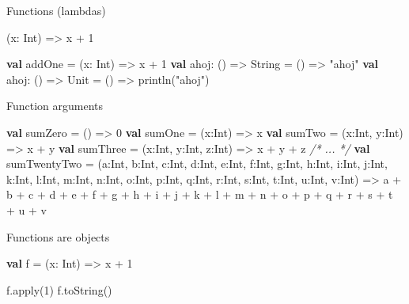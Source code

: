 \documentclass[ignorenonframetext,]{beamer}
\newenvironment{Shaded}{\begin{snugshade}}{\end{snugshade}}
\newcommand{\KeywordTok}[1]{\textcolor[rgb]{0.13,0.29,0.53}{\textbf{#1}}}
\newcommand{\DecValTok}[1]{\textcolor[rgb]{0.00,0.00,0.81}{#1}}
\newcommand{\StringTok}[1]{\textcolor[rgb]{0.31,0.60,0.02}{#1}}
\newcommand{\CommentTok}[1]{\textcolor[rgb]{0.56,0.35,0.01}{\textit{#1}}}
\newcommand{\FunctionTok}[1]{\textcolor[rgb]{0.00,0.00,0.00}{#1}}
\newcommand{\NormalTok}[1]{#1}
\begin{document}
\begin{frame}[fragile]
\begin{block}{Functions (lambdas)}
\begin{Shaded}
\begin{Highlighting}[]
\NormalTok{(x: Int) => x + }\DecValTok{1}
\end{Highlighting}
\end{Shaded}

\begin{Shaded}
\begin{Highlighting}[]
\KeywordTok{val}\NormalTok{ addOne = (x: Int) => x + }\DecValTok{1}
\KeywordTok{val}\NormalTok{ ahoj: () => String = () => }\StringTok{"ahoj"}
\KeywordTok{val}\NormalTok{ ahoj: () => Unit = () => }\FunctionTok{println}\NormalTok{(}\StringTok{"ahoj"}\NormalTok{)}
\end{Highlighting}
\end{Shaded}

\end{block}

\begin{block}{Function arguments}

\begin{Shaded}
\begin{Highlighting}[]
\KeywordTok{val}\NormalTok{ sumZero = () => }\DecValTok{0}
\KeywordTok{val}\NormalTok{ sumOne = (x:Int) => x}
\KeywordTok{val}\NormalTok{ sumTwo = (x:Int, y:Int) => x + y}
\KeywordTok{val}\NormalTok{ sumThree = (x:Int, y:Int, z:Int) => x + y + z}
\CommentTok{/* ... */}
\KeywordTok{val}\NormalTok{ sumTwentyTwo = (a:Int, b:Int, c:Int, d:Int, e:Int, f:Int, }
\NormalTok{                    g:Int, h:Int, i:Int, j:Int, k:Int, l:Int, }
\NormalTok{                    m:Int, n:Int, o:Int, p:Int, q:Int, r:Int, }
\NormalTok{                    s:Int, t:Int, u:Int, v:Int) => }
\NormalTok{                    a + b + c + d + e + f + g + h + i + j + }
\NormalTok{                    k + l + m + n + o + p + q + r + s + t + }
\NormalTok{                    u + v}
\end{Highlighting}
\end{Shaded}

\end{block}

\begin{block}{Functions are objects}

\begin{Shaded}
\begin{Highlighting}[]
\KeywordTok{val}\NormalTok{ f = (x: Int) => x + }\DecValTok{1}

\NormalTok{f.}\FunctionTok{apply}\NormalTok{(}\DecValTok{1}\NormalTok{)}
\NormalTok{f.}\FunctionTok{toString}\NormalTok{()}
\end{Highlighting}
\end{Shaded}


\end{block}
\end{frame}
\end{document}
